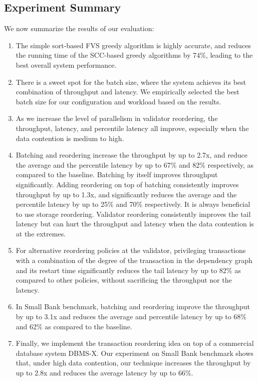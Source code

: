 






\subsection{Experiment Summary}

We now summarize the results of our evaluation:
\vspace{-.5em}
\begin{enumerate}[leftmargin=*]
\item The simple sort-based FVS greedy algorithm is highly accurate, and reduces the running time of the SCC-based greedy algorithms by 74\%, leading to the best overall system performance. 
\item There is a sweet spot for the batch size, where the system achieves its best combination of throughput and latency. We empirically selected the best batch size for our configuration and workload based on the results.
\item As we increase the level of parallelism in validator reordering, the throughput, latency, and percentile latency all improve, especially when the data contention is medium to high.
\item Batching and reordering increase the throughput by up to 2.7x, and reduce the average and the percentile latency by up to 67\% and 82\% respectively, as compared to the baseline. Batching by itself improves throughput significantly. Adding reordering on top of batching consistently improves throughput by up to 1.3x, and significantly reduces the average and the percentile latency by up to 25\% and 70\% respectively. It is always beneficial to use storage reordering. Validator reordering consistently improves the tail latency but can hurt the throughput and latency when the data contention is at the extremes.
\item For alternative reordering policies at the validator, privileging transactions with a combination of the degree of the transaction in the dependency graph and its restart time significantly reduces the tail latency by up to 82\% as compared to other policies, without sacrificing the throughput nor the latency.
\item In Small Bank benchmark, batching and reordering improve the throughput by up to 3.1x and reduces the average and percentile latency by up to 68\% and 62\% as compared to the baseline.
\item Finally, we implement the transaction reordering idea on top of a commercial database system DBMS-X. Our experiment on Small Bank benchmark shows that, under high data contention, our technique increases the throughput by up to 2.8x and reduces the average latency by up to 66\%.
\end{enumerate}  
